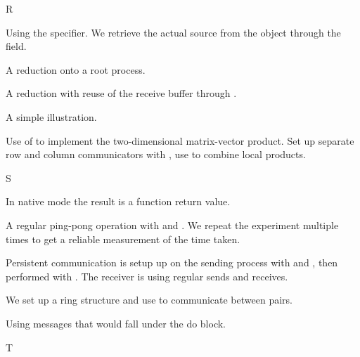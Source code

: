  {R}


Using the  specifier. We retrieve the
actual source from the  object through the
 field.
%
%


A reduction onto a root process.
%

A reduction with reuse of the receive buffer through
.
%


A simple illustration.
%

Use of  to implement the two-dimensional
matrix-vector product.
Set up separate row and column communicators with
, use  to combine
local products.
%

 {S}


In native mode the result is a function return value.
%


A regular ping-pong operation with  and
. We repeat the experiment multiple times to
get a reliable measurement of the time taken.
%


Persistent communication is setup up on the sending process with
 and , then
performed with . The receiver is using
regular sends and receives.
%
%


We set up a ring structure and use  to communicate
between pairs.
%


Using  messages that would fall under the
 do block.
%

 {T}

